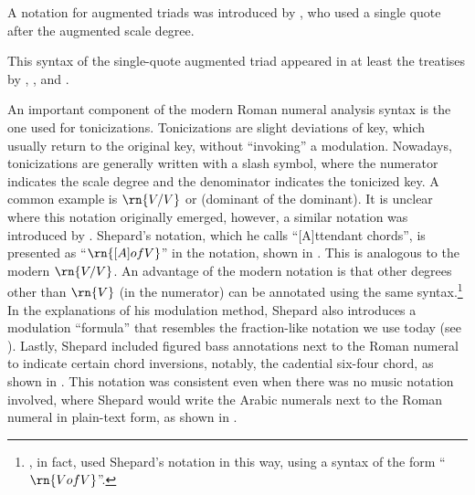 
A notation for augmented triads was introduced by
\textcite{jadassohn1883lehrbuch}, who used a single quote
after the augmented scale degree.


This syntax of the single-quote augmented triad appeared in
at least the treatises by \textcite{broekhoven1889system},
\textcite{buwa1893schule}, and
\textcite{shepard1896harmony}.


An important component of the modern Roman numeral analysis
syntax is the one used for tonicizations. Tonicizations are
slight deviations of key, which usually return to the
original key, without ``invoking'' a modulation. Nowadays,
tonicizations are generally written with a slash symbol,
where the numerator indicates the scale degree and the
denominator indicates the tonicized key. A common example is
$\rn{V/V}$ or (dominant of the dominant). It is unclear
where this notation originally emerged, however, a similar
notation was introduced by \textcite{shepard1889how}.
Shepard's notation, which he calls ``[A]ttendant chords'',
is presented as ``$\rn{[A] of V}$'' in the notation, shown
in . This is
analogous to the modern $\rn{V/V}$. An advantage of the
modern notation is that other degrees other than $\rn{V}$
(in the numerator) can be annotated using the same
syntax.\footnote{\textcite{piston1941harmony}, in fact, used
Shepard's notation in this way, using a syntax of the form
``$\rn{V of V}$''.} In the explanations of his modulation
method, Shepard also introduces a modulation ``formula''
that resembles the fraction-like notation we use today (see
). Lastly, Shepard
included figured bass annotations next to the Roman numeral
to indicate certain chord inversions, notably, the cadential
six-four chord, as shown in
. This
notation was consistent even when there was no music
notation involved, where Shepard would write the Arabic
numerals next to the Roman numeral in plain-text form, as
shown in .

